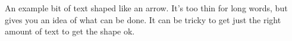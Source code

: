 \begin{minipage}[b]{1in}

An example bit of text shaped like an arrow. It's too thin for long
words, but gives you an idea of what can be done. It can be tricky
to get just the right amount of text to get the shape ok.
\par
\end{minipage}
